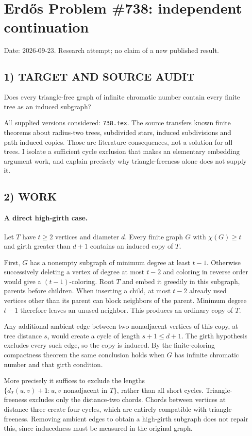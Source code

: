 \section{Erd\H{o}s Problem \#738: independent continuation}
\noindent Date: 2026-09-23. Research attempt; no claim of a new published result.
\subsection{1) TARGET AND SOURCE AUDIT}
Does every triangle-free graph of infinite chromatic number contain every finite tree as an induced subgraph?

All supplied versions considered: \texttt{738.tex}.
The source transfers known finite theorems about radius-two trees, subdivided stars, induced subdivisions and path-induced copies. Those are literature consequences, not a solution for all trees. I isolate a sufficient cycle exclusion that makes an elementary embedding argument work, and explain precisely why triangle-freeness alone does not supply it.
\subsection{2) WORK}
\paragraph{A direct high-girth case.}
Let $T$ have $t\ge2$ vertices and diameter $d$. Every finite graph $G$ with $\chi(G)\ge t$ and girth greater than $d+1$ contains an induced copy of $T$.

First, $G$ has a nonempty subgraph of minimum degree at least $t-1$. Otherwise successively deleting a vertex of degree at most $t-2$ and coloring in reverse order would give a $(t-1)$-coloring. Root $T$ and embed it greedily in this subgraph, parents before children. When inserting a child, at most $t-2$ already used vertices other than its parent can block neighbors of the parent. Minimum degree $t-1$ therefore leaves an unused neighbor. This produces an ordinary copy of $T$.

Any additional ambient edge between two nonadjacent vertices of this copy, at tree distance $s$, would create a cycle of length $s+1\le d+1$. The girth hypothesis excludes every such edge, so the copy is induced. By the finite-coloring compactness theorem the same conclusion holds when $G$ has infinite chromatic number and that girth condition.

More precisely it suffices to exclude the lengths $\{d_T(u,v)+1:u,v\text{ nonadjacent in }T\}$, rather than all short cycles. Triangle-freeness excludes only the distance-two chords. Chords between vertices at distance three create four-cycles, which are entirely compatible with triangle-freeness. Removing ambient edges to obtain a high-girth subgraph does not repair this, since inducedness must be measured in the original graph.
